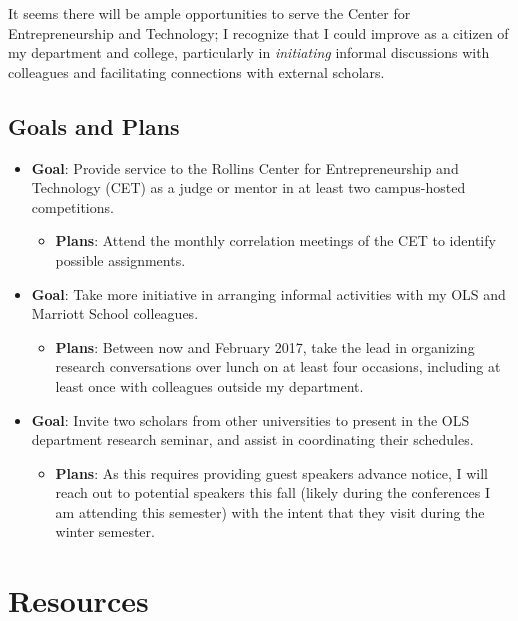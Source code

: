 \documentclass[11pt,article,oneside]{memoir}
\begin{document}
It seems there will be ample opportunities to serve the Center for
Entrepreneurship and Technology; I recognize that I could improve as a
citizen of my department and college, particularly in \emph{initiating}
informal discussions with colleagues and facilitating connections with
external scholars.

\subsection{Goals and Plans}\label{goals-and-plans-2}

\begin{itemize}
\tightlist
\item
  \textbf{Goal}: Provide service to the Rollins Center for
  Entrepreneurship and Technology (CET) as a judge or mentor in at least
  two campus-hosted competitions.

  \begin{itemize}
  \tightlist
  \item
    \textbf{Plans}: Attend the monthly correlation meetings of the CET
    to identify possible assignments.
  \end{itemize}
\item
  \textbf{Goal}: Take more initiative in arranging informal activities
  with my OLS and Marriott School colleagues.

  \begin{itemize}
  \tightlist
  \item
    \textbf{Plans}: Between now and February 2017, take the lead in
    organizing research conversations over lunch on at least four
    occasions, including at least once with colleagues outside my
    department.
  \end{itemize}
\item
  \textbf{Goal}: Invite two scholars from other universities to present
  in the OLS department research seminar, and assist in coordinating
  their schedules.

  \begin{itemize}
  \tightlist
  \item
    \textbf{Plans}: As this requires providing guest speakers advance
    notice, I will reach out to potential speakers this fall (likely
    during the conferences I am attending this semester) with the intent
    that they visit during the winter semester.
  \end{itemize}
\end{itemize}

\section{Resources}\label{resources}
\end{document}
